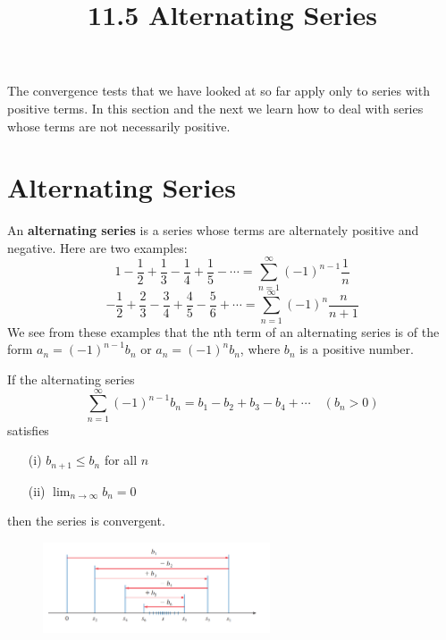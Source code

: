 \documentclass{article}
\title{11.5 Alternating Series}
\date{}
\author{}
\theoremstyle{mystyle}
\begin{document}
\maketitle

The convergence tests that we have looked at so far apply only to series with positive terms. In this section and the next we learn how to deal with series whose terms are not necessarily positive.

\section*{Alternating Series}
An \textbf{alternating series} is a series whose terms are alternately positive and negative. Here are two examples:
\[ 1 - \frac{1}{2} + \frac{1}{3} - \frac{1}{4} + \frac{1}{5} - \cdots = \sum_{n=1}^{\infty} (-1)^{n-1} \frac{1}{n} \]
\[ -\frac{1}{2} + \frac{2}{3} - \frac{3}{4} + \frac{4}{5} - \frac{5}{6} + \cdots = \sum_{n=1}^{\infty} (-1)^{n} \frac{n}{n+1} \]
We see from these examples that the nth term of an alternating series is of the form \( a_n = (-1)^{n-1}b_n \) or \( a_n = (-1)^n b_n \), where \(b_n\) is a positive number.

\begin{tcolorbox}[
    colback=white,
    colframe=orange!80!white,
    title=The Alternating Series Test,
    boxrule=0.5mm,
    arc=3mm
    ]
    If the alternating series
    \[ \sum_{n=1}^{\infty} (-1)^{n-1}b_n = b_1 - b_2 + b_3 - b_4 + \cdots \quad (b_n > 0) \]
    satisfies
    \begin{itemize}
        \item[(i)] \( b_{n+1} \le b_n \) for all \(n\)
        \item[(ii)] \( \lim_{n\to\infty} b_n = 0 \)
    \end{itemize}
    then the series is convergent.
\end{tcolorbox}

\begin{figure}[htbp]
  \centering
  \includegraphics[width=0.6\textwidth]{graph76.png}
\end{figure}
\end{document}
